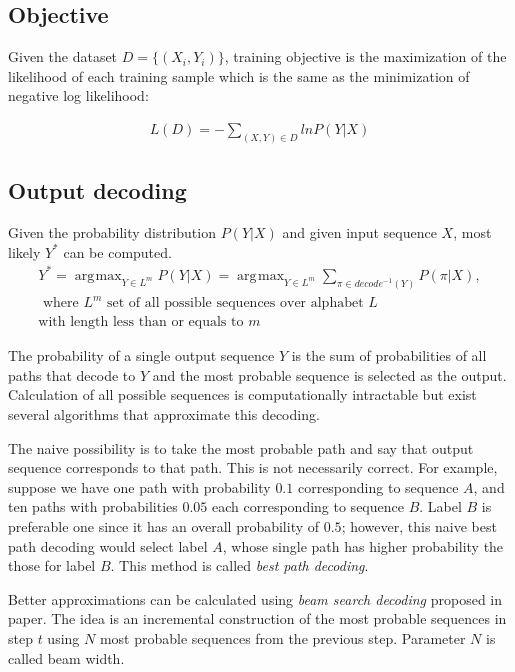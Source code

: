 \documentclass[times, utf8, diplomski, numeric, english]{fer}
\DeclareMathOperator*{\argmax}{\arg\!\max}
\begin{document}
\subsection{Objective}
Given the dataset $D = \{(X_i, Y_i)\}$, training objective is the maximization of the likelihood of each training sample  which is the same as the minimization of negative log likelihood:

\begin{equation}
\begin{gathered}
L(D) = - \sum_{(X,Y)\in D}^{} ln P(Y | X)
\end{gathered}
\end{equation}


\subsection{Output decoding}
Given the probability distribution $P(Y | X)$ and given input sequence $X$, most likely $Y^{*}$ can be computed.
\begin{equation}
\begin{gathered}
Y^{*} = \argmax_{Y \in L^m} P(Y|X) = \argmax_{Y \in L^m} \sum_{\pi \in decode^{-1}(Y)}^{} P(\pi | X),\\
\text{~where $L^m$ set of all possible sequences over alphabet $L$ }\\
\text{with length less than or equals to $m$}
\end{gathered}
\end{equation}

The probability of a single output sequence $Y$ is the sum of probabilities of all paths that decode to $Y$ and the most probable sequence is selected as the output.
Calculation of all possible sequences is computationally intractable but exist several algorithms that approximate this decoding. 

The naive possibility is to take the most probable path and say that output sequence corresponds to that path.
This is not necessarily correct.  For example, suppose we have one path with probability $0.1$ corresponding to sequence $A$, and ten paths with probabilities  $0.05$ each corresponding to sequence $B$. Label $B$ is preferable one since it has an overall probability of $0.5$; however, this naive best path decoding would select label $A$, whose single path has higher probability the those for label $B$. This method is called \textit{best path decoding}.

Better approximations can be calculated using \textit{beam search decoding} proposed in paper\cite{graves_decode}.  
The idea is an incremental construction of the most probable sequences in step $t$ using $N$ most probable sequences from the previous step. Parameter $N$ is called beam width. 
\end{document}
